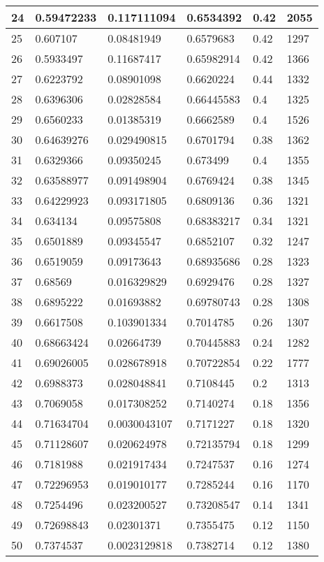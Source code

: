 \begin{longtable}{|l|l|l|l|l|l|}
24 & 0.59472233 & 0.117111094 & 0.6534392 & 0.42 & 2055 \\ \hline 
25 & 0.607107 & 0.08481949 & 0.6579683 & 0.42 & 1297 \\ \hline 
26 & 0.5933497 & 0.11687417 & 0.65982914 & 0.42 & 1366 \\ \hline 
27 & 0.6223792 & 0.08901098 & 0.6620224 & 0.44 & 1332 \\ \hline 
28 & 0.6396306 & 0.02828584 & 0.66445583 & 0.4 & 1325 \\ \hline 
29 & 0.6560233 & 0.01385319 & 0.6662589 & 0.4 & 1526 \\ \hline 
30 & 0.64639276 & 0.029490815 & 0.6701794 & 0.38 & 1362 \\ \hline 
31 & 0.6329366 & 0.09350245 & 0.673499 & 0.4 & 1355 \\ \hline 
32 & 0.63588977 & 0.091498904 & 0.6769424 & 0.38 & 1345 \\ \hline 
33 & 0.64229923 & 0.093171805 & 0.6809136 & 0.36 & 1321 \\ \hline 
34 & 0.634134 & 0.09575808 & 0.68383217 & 0.34 & 1321 \\ \hline 
35 & 0.6501889 & 0.09345547 & 0.6852107 & 0.32 & 1247 \\ \hline 
36 & 0.6519059 & 0.09173643 & 0.68935686 & 0.28 & 1323 \\ \hline 
37 & 0.68569 & 0.016329829 & 0.6929476 & 0.28 & 1327 \\ \hline 
38 & 0.6895222 & 0.01693882 & 0.69780743 & 0.28 & 1308 \\ \hline 
39 & 0.6617508 & 0.103901334 & 0.7014785 & 0.26 & 1307 \\ \hline 
40 & 0.68663424 & 0.02664739 & 0.70445883 & 0.24 & 1282 \\ \hline 
41 & 0.69026005 & 0.028678918 & 0.70722854 & 0.22 & 1777 \\ \hline 
42 & 0.6988373 & 0.028048841 & 0.7108445 & 0.2 & 1313 \\ \hline 
43 & 0.7069058 & 0.017308252 & 0.7140274 & 0.18 & 1356 \\ \hline 
44 & 0.71634704 & 0.0030043107 & 0.7171227 & 0.18 & 1320 \\ \hline 
45 & 0.71128607 & 0.020624978 & 0.72135794 & 0.18 & 1299 \\ \hline 
46 & 0.7181988 & 0.021917434 & 0.7247537 & 0.16 & 1274 \\ \hline 
47 & 0.72296953 & 0.019010177 & 0.7285244 & 0.16 & 1170 \\ \hline 
48 & 0.7254496 & 0.023200527 & 0.73208547 & 0.14 & 1341 \\ \hline 
49 & 0.72698843 & 0.02301371 & 0.7355475 & 0.12 & 1150 \\ \hline 
50 & 0.7374537 & 0.0023129818 & 0.7382714 & 0.12 & 1380 \\ \hline 
\end{longtable}